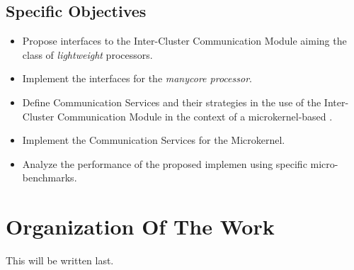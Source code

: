 \subsection{Specific Objectives}
\label{sec.objectives.specific}

	\begin{itemize}
		\item Propose interfaces to the Inter-Cluster Communication Module aiming
			the class of \textit{lightweight} \manycore processors.
		\item Implement the interfaces for the \textit{\mppa manycore processor}.
		\item Define Communication Services and their strategies in the use of the Inter-Cluster
			Communication Module in the context of a microkernel-based \os.
		\item Implement the Communication Services for the \nanvix Microkernel.
		\item Analyze the performance of the proposed implemen using specific micro-benchmarks.
	\end{itemize}

\section{Organization Of The Work}
\label{sec.organization}

	This will be written last.